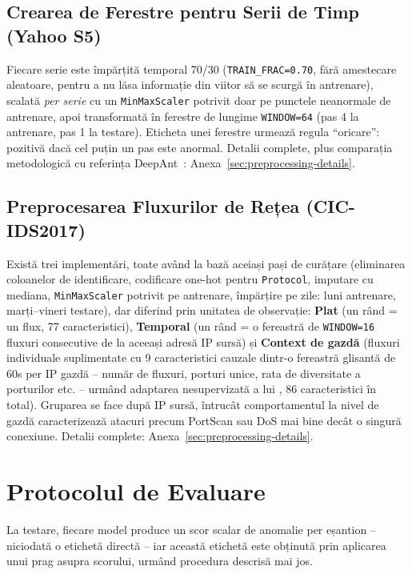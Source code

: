 \subsection{Crearea de Ferestre pentru Serii de Timp (Yahoo S5)}

Fiecare serie este împărțită temporal 70/30 (\texttt{TRAIN\_FRAC=0.70}, fără amestecare aleatoare, pentru a nu lăsa informație din viitor să se scurgă în antrenare), scalată \emph{per serie} cu un \texttt{MinMaxScaler} potrivit doar pe punctele neanormale de antrenare, apoi transformată în ferestre de lungime \texttt{WINDOW=64} (pas 4 la antrenare, pas 1 la testare). Eticheta unei ferestre urmează regula \enquote{oricare}: pozitivă dacă cel puțin un pas este anormal. Detalii complete, plus comparația metodologică cu referința DeepAnt~\parencite{munir2019deepant}: Anexa~\ref{sec:preprocessing-details}.

\subsection{Preprocesarea Fluxurilor de Rețea (CIC-IDS2017)}

Există trei implementări, toate având la bază aceiași pași de curățare (eliminarea coloanelor de identificare, codificare one-hot pentru \texttt{Protocol}, imputare cu mediana, \texttt{MinMaxScaler} potrivit pe antrenare, împărțire pe zile: luni antrenare, marți--vineri testare), dar diferind prin unitatea de observație: \textbf{Plat} (un rând = un flux, 77 caracteristici), \textbf{Temporal} (un rând = o fereastră de \texttt{WINDOW=16} fluxuri consecutive de la aceeași adresă IP sursă) și \textbf{Context de gazdă} (fluxuri individuale suplimentate cu 9 caracteristici cauzale dintr-o fereastră glisantă de 60s per IP gazdă -- număr de fluxuri, porturi unice, rata de diversitate a porturilor etc. -- urmând adaptarea nesupervizată a lui \textcite{raskovalov2024nids}, 86 caracteristici în total). Gruparea se face după IP sursă, întrucât comportamentul la nivel de gazdă caracterizează atacuri precum PortScan sau DoS mai bine decât o singură conexiune. Detalii complete: Anexa~\ref{sec:preprocessing-details}.

\section{Protocolul de Evaluare}
\label{sec:eval-protocol}

La testare, fiecare model produce un scor scalar de anomalie per eșantion -- niciodată o etichetă directă -- iar această etichetă este obținută prin aplicarea unui prag asupra scorului, urmând procedura descrisă mai jos.

